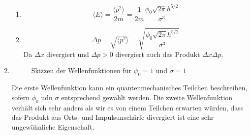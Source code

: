 \begin{enumerate}
\begin{enumerate}
\item 
\begin{equation}
  \langle E \rangle = \frac{\langle p^2 \rangle}{2 m} = \frac{1}{2m} \frac{\phi_0 \sqrt{2 \pi} h^{5/2}}{\sigma^3}
\end{equation}
\item \begin{equation}
  \Delta p = \sqrt{\langle p^2 \rangle} = \sqrt{\frac{\phi_0 \sqrt{2 \pi} h^{5/2}}{\sigma^3}}
\end{equation}
Da $\Delta x$ divergiert und $\Delta p >0 $ divergiert auch das Produkt $\Delta x \Delta p$. 
\end{enumerate}
\item 
\begin{figure}[htbp]
\centering

\caption{Skizzen der Wellenfunktionen für $\psi_0=1$ und $\sigma=1$}
\label{fig:plots}
\end{figure}
Die erste Wellenfunktion kann ein quantenmechanisches Teilchen beschreiben, sofern $\phi_0$ udn $\sigma$ entsprechend gewählt werden. Die zweite Wellenfunktion verhält sich sehr anders als wir es von einem Teilchen erwarten würden, dass das Produkt aus Orts- und Impulsunschärfe divergiert ist eine sehr ungewöhnliche Eigenschaft. 
\end{enumerate}